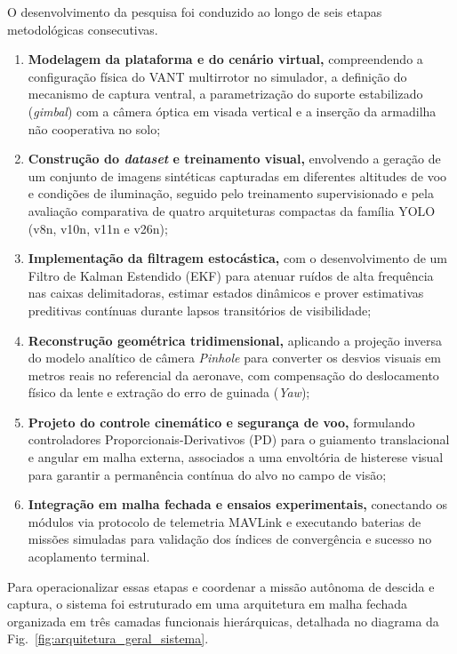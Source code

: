 O desenvolvimento da pesquisa foi conduzido ao longo de seis etapas metodológicas consecutivas.
\begin{enumerate}
    \item \textbf{Modelagem da plataforma e do cenário virtual,} compreendendo a configuração física do VANT multirrotor no simulador, a definição do mecanismo de captura ventral, a parametrização do suporte estabilizado (\textit{gimbal}) com a câmera óptica em visada vertical e a inserção da armadilha não cooperativa no solo;
    
    \item \textbf{Construção do \textit{dataset} e treinamento visual,} envolvendo a geração de um conjunto de imagens sintéticas capturadas em diferentes altitudes de voo e condições de iluminação, seguido pelo treinamento supervisionado e pela avaliação comparativa de quatro arquiteturas compactas da família YOLO (v8n, v10n, v11n e v26n);
    
    \item \textbf{Implementação da filtragem estocástica,} com o desenvolvimento de um Filtro de Kalman Estendido (EKF) para atenuar ruídos de alta frequência nas caixas delimitadoras, estimar estados dinâmicos e prover estimativas preditivas contínuas durante lapsos transitórios de visibilidade;
    
    \item \textbf{Reconstrução geométrica tridimensional,} aplicando a projeção inversa do modelo analítico de câmera \textit{Pinhole} para converter os desvios visuais em metros reais no referencial da aeronave, com compensação do deslocamento físico da lente e extração do erro de guinada (\textit{Yaw});
    
    \item \textbf{Projeto do controle cinemático e segurança de voo,} formulando controladores Proporcionais-Derivativos (PD) para o guiamento translacional e angular em malha externa, associados a uma envoltória de histerese visual para garantir a permanência contínua do alvo no campo de visão;
    
    \item \textbf{Integração em malha fechada e ensaios experimentais,} conectando os módulos via protocolo de telemetria MAVLink e executando baterias de missões simuladas para validação dos índices de convergência e sucesso no acoplamento terminal.
\end{enumerate}

Para operacionalizar essas etapas e coordenar a missão autônoma de descida e captura, o sistema foi estruturado em uma arquitetura em malha fechada organizada em três camadas funcionais hierárquicas, detalhada no diagrama da Fig.~\ref{fig:arquitetura_geral_sistema}.

